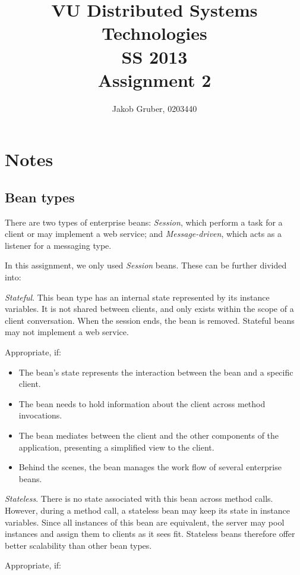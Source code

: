 \documentclass[a4paper,10pt]{article}
\title{VU Distributed Systems Technologies \\
       SS 2013 \\
       Assignment 2}
\author{Jakob Gruber, 0203440}
\begin{document}
\maketitle

\section{Notes}

\subsection{Bean types} \label{sec:beans}

There are two types of enterprise beans: \emph{Session}, which perform a task for
a client or may implement a web service; and \emph{Message-driven}, which acts
as a listener for a messaging type.

In this assignment, we only used \emph{Session} beans. These can be further divided
into:

\emph{Stateful}. This bean type has an internal state represented by its instance variables.
It is not shared between clients, and only exists within the scope of a client
conversation. When the session ends, the bean is removed. Stateful beans may not implement
a web service.

Appropriate, if: 

\begin{itemize}
    \item The bean’s state represents the interaction between the bean and a specific client.
    \item The bean needs to hold information about the client across method invocations.
    \item The bean mediates between the client and the other components of the application, presenting a simplified view to the client.
    \item Behind the scenes, the bean manages the work flow of several enterprise beans.
\end{itemize}

\emph{Stateless}. There is no state associated with this bean across method calls. However,
during a method call, a stateless bean may keep its state in instance variables.
Since all instances of this bean are equivalent, the server may pool instances and
assign them to clients as it sees fit. Stateless beans therefore offer better scalability
than other bean types. 

Appropriate, if: 
\end{document}
